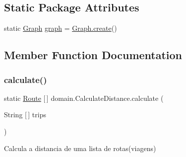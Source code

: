 \subsection*{Static Package Attributes}
\begin{DoxyCompactItemize}
\item 
static \hyperlink{classdomain_1_1_graph}{Graph} \hyperlink{classdomain_1_1_calculate_distance_aa7288f0798e8e530b5fd8c228a7b028c}{graph} = \hyperlink{classdomain_1_1_graph_a57ce4efd344c059a565f4bb104fdee64}{Graph.\+create}()
\end{DoxyCompactItemize}


\subsection{Member Function Documentation}
\mbox{\label{classdomain_1_1_calculate_distance_ad08ace3a0aa30e9ec6c99e8826630ad3}} 
\subsubsection{\texorpdfstring{calculate()}{calculate()}}
{\footnotesize\ttfamily static \hyperlink{classdomain_1_1_route}{Route} \mbox{[}$\,$\mbox{]} domain.\+Calculate\+Distance.\+calculate (\begin{DoxyParamCaption}\item[{String \mbox{[}$\,$\mbox{]}}]{trips }\end{DoxyParamCaption})\hspace{0.3cm}{\ttfamily [static]}}

Calcula a distancia de uma lista de rotas(viagens)


